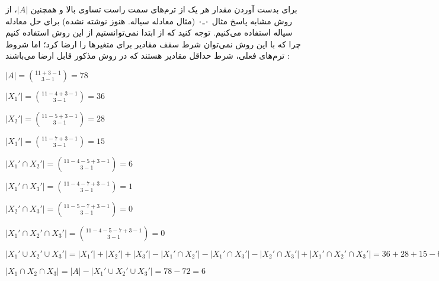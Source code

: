 \begin{problem}
{        برای بدست آوردن مقدار هر یک از ترم‌های سمت راست تساوی بالا و همچنین
        $|A|$،
        از روش مشابه پاسخ مثال ۰ـ۰
        (مثال معادله سیاله. هنوز نوشته نشده)
        برای حل معادله سیاله استفاده می‌کنیم. توجه کنید که از ابتدا نمی‌توانستیم
        از این روش استفاده کنیم چرا که با این روش نمی‌توان شرط سقف مقادیر برای
        متغیر‌ها را ارضا کرد؛ اما شروط ترم‌های فعلی، شرط حداقل مقادیر هستند که
        در روش مذکور قابل ارضا می‌باشند :
        
        \begin{center}
        $ |A| = \binom{11+3-1}{3-1} = 78 $
    
        $ |X_1'| = \binom{11-4+3-1}{3-1} = 36 $
        
        $ |X_2'| = \binom{11-5+3-1}{3-1} = 28 $
    
        $ |X_3'| = \binom{11-7+3-1}{3-1} = 15 $
    
        $ |X_1' \cap X_2'| = \binom{11-4-5+3-1}{3-1} = 6 $
    
        $ |X_1' \cap X_3'| = \binom{11-4-7+3-1}{3-1} = 1 $
    
        $ |X_2' \cap X_3'| = \binom{11-5-7+3-1}{3-1} = 0 $
    
        $ |X_1' \cap X_2' \cap X_3'| = \binom{11-4-5-7+3-1}{3-1} = 0 $
    
        $ |X_1' \cup X_2' \cup X_3'| = |X_1'| + |X_2'| + |X_3'| - |X_1' \cap X_2'| - |X_1' \cap X_3'| - |X_2' \cap X_3'| + |X_1' \cap X_2' \cap X_3'| 
        = 36 + 28 + 15 - 6 - 1 - 0 + 0 = 72 $
    
        $ |X_1 \cap X_2 \cap X_3| = |A| - |X_1' \cup X_2' \cup X_3'| = 78 - 72 = 6 $
        \end{center}
    }
  
\end{problem}